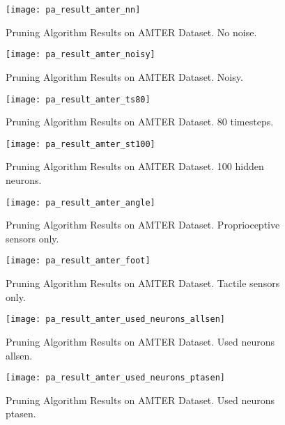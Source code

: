 \begin{figure}[H]
  \centering
  \texttt{[image: pa\_result\_amter\_nn]}
  \caption{Pruning Algorithm Results on AMTER Dataset. No noise.}
  \label{fig:pa_result_amter}
\end{figure}

\begin{figure}[H]
  \centering
  \texttt{[image: pa\_result\_amter\_noisy]}
  \caption{Pruning Algorithm Results on AMTER Dataset. Noisy.}
  \label{fig:pa_result_amter_noisy}
\end{figure}

\begin{figure}[H]
  \centering
  \texttt{[image: pa\_result\_amter\_ts80]}
  \caption{Pruning Algorithm Results on AMTER Dataset. 80 timesteps.}
  \label{fig:pa_result_amter_80}
\end{figure}

\begin{figure}[H]
  \centering
  \texttt{[image: pa\_result\_amter\_st100]}
  \caption{Pruning Algorithm Results on AMTER Dataset. 100 hidden neurons.}
  \label{fig:pa_result_amter_st100}
\end{figure}

\begin{figure}[H]
  \centering
  \texttt{[image: pa\_result\_amter\_angle]}
  \caption{Pruning Algorithm Results on AMTER Dataset. Proprioceptive sensors only.}
  \label{fig:pa_result_amter_angle}
\end{figure}

\begin{figure}[H]
  \centering
  \texttt{[image: pa\_result\_amter\_foot]}
  \caption{Pruning Algorithm Results on AMTER Dataset. Tactile sensors only.}
  \label{fig:pa_result_amter_foot}
\end{figure}

\begin{figure}[H]
  \centering
  \texttt{[image: pa\_result\_amter\_used\_neurons\_allsen]}
  \caption{Pruning Algorithm Results on AMTER Dataset. Used neurons allsen.}
  \label{fig:pa_amter_used_neurons_allsen}
\end{figure}

\begin{figure}[H]
  \centering
  \texttt{[image: pa\_result\_amter\_used\_neurons\_ptasen]}
  \caption{Pruning Algorithm Results on AMTER Dataset. Used neurons ptasen.}
  \label{fig:pa_amter_used_neurons_ptasen}
\end{figure}

